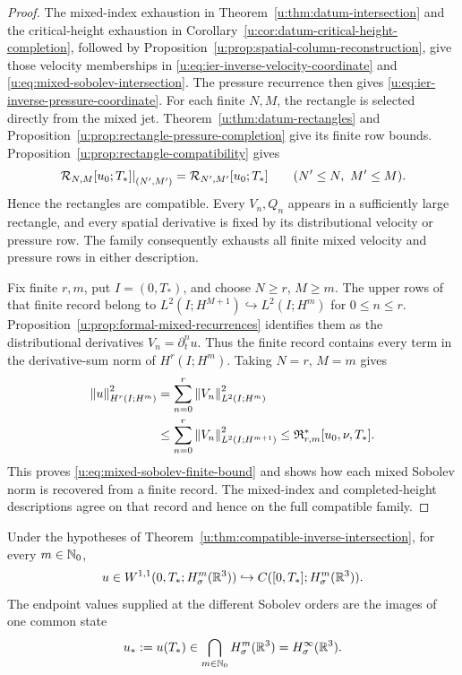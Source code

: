 \begin{proof}
The mixed-index exhaustion in Theorem~\ref{u:thm:datum-intersection} and the
critical-height exhaustion in
Corollary~\ref{u:cor:datum-critical-height-completion}, followed by
Proposition~\ref{u:prop:spatial-column-reconstruction}, give those velocity
memberships in \eqref{u:eq:ier-inverse-velocity-coordinate} and
\eqref{u:eq:mixed-sobolev-intersection}.  The pressure recurrence then gives
\eqref{u:eq:ier-inverse-pressure-coordinate}.
For each finite \(N,M\), the rectangle is selected directly from the mixed
jet.
Theorem~\ref{u:thm:datum-rectangles} and
Proposition~\ref{u:prop:rectangle-pressure-completion} give its finite row
bounds.  Proposition~\ref{u:prop:rectangle-compatibility} gives
\[
 \left.\mathcal R_{N,M}[u_0;T_*]\right|_{(N',M')}
 =\mathcal R_{N',M'}[u_0;T_*]
 \qquad(N'\le N,\ M'\le M).
\]
Hence the rectangles are compatible.  Every \(V_n,Q_n\) appears in a
sufficiently large rectangle, and every
spatial derivative is fixed by its distributional velocity or pressure
row.  The family consequently exhausts all finite mixed velocity and pressure
rows in either description.

Fix finite \(r,m\), put \(I=(0,T_*)\), and choose \(N\ge r\),
\(M\ge m\). The upper rows of that finite record belong to
\(L^2(I;H^{M+1})\hookrightarrow L^2(I;H^m)\) for \(0\le n\le r\).
Proposition~\ref{u:prop:formal-mixed-recurrences} identifies them as the
distributional derivatives \(V_n=\partial_t^nu\). Thus the finite record
contains every term in the derivative-sum norm of \(H^r(I;H^m)\).
Taking \(N=r\), \(M=m\) gives
\[
 \begin{aligned}
 \left\lVert u\right\rVert_{H^r(I;H^m)}^2
 &=\sum_{n=0}^r\left\lVert V_n\right\rVert_{L^2(I;H^m)}^2\\
 &\le\sum_{n=0}^r\left\lVert V_n\right\rVert_{L^2(I;H^{m+1})}^2
 \le\mathfrak R_{r,m}^*[u_0,\nu,T_*].
 \end{aligned}
\]
This proves \eqref{u:eq:mixed-sobolev-finite-bound} and shows how each
mixed Sobolev norm is recovered from a finite record.  The mixed-index and
completed-height descriptions agree on that record and hence on the full
compatible family.
\end{proof}

\begin{proposition}
\label{u:prop:ier-complete-spatial-endpoint}
Under the hypotheses of
Theorem~\ref{u:thm:compatible-inverse-intersection}, for every
\(m\in\mathbb N_0\),
\begin{equation}
 u\in W^{1,1}(0,T_*;H^m_\sigma(\mathbb R^3))
 \hookrightarrow C([0,T_*];H^m_\sigma(\mathbb R^3)).
 \label{u:eq:ier-spatial-row-W11}
\end{equation}
The endpoint values supplied at the different Sobolev orders are the images
of one common state
\begin{equation}
 u_*:=u(T_*)\in\bigcap_{m\in\mathbb N_0}H^m_\sigma(\mathbb R^3)
 =H^\infty_\sigma(\mathbb R^3).
 \label{u:eq:ier-common-spatial-endpoint}
\end{equation}
\end{proposition}


